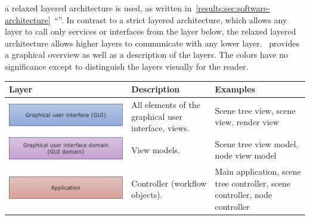 \documentclass[%
    a4paper,    %
    justified,  %
    nobib,      %
    openany     %
]{tufte-book}
\begin{document}
 a relaxed layered architecture
is used, as written
in~\autoref{results:sec:software-architecture}~\enquote{}.
In contrast to a strict layered architecture, which allows any layer to call
only services or interfaces from the layer below, the relaxed layered
architecture allows higher layers to communicate with any lower
layer.~ provides a graphical overview as well as a
description of the layers. The colors have no significance except to distinguish
the layers visually for the reader.

\begin{table}[h]
  \begin{tabularx}{\textwidth}{XXX}
    \toprule
    \textbf{Layer} & \textbf{Description} & \textbf{Examples} \\
    \midrule
    \includegraphics[width=1.0\linewidth]{images/layers-gui}         & All elements of the graphical user interface, views.                                & Scene tree view, scene view, render view                                   \\
    \includegraphics[width=1.0\linewidth]{images/layers-gui-domain}  & View models.                                                                        & Scene tree view model, node view model                                     \\
    \includegraphics[width=1.0\linewidth]{images/layers-application} & Controller (workflow objects).                                                      & Main application, scene tree controller, scene controller, node controller \\

\end{tabularx}
\end{table}
\end{document}
